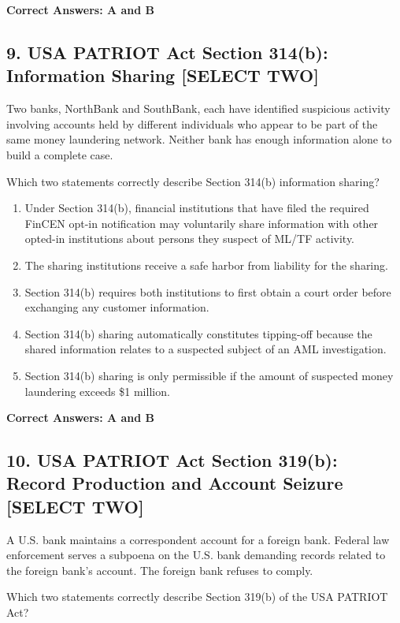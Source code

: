 \documentclass[11pt,a4paper]{article}
\begin{document}
	\textbf{Correct Answers: A and B}
	
	\subsection{9. USA PATRIOT Act Section 314(b): Information Sharing \textnormal{[SELECT TWO]}}
	
	Two banks, NorthBank and SouthBank, each have identified suspicious activity involving accounts held by different individuals who appear to be part of the same money laundering network. Neither bank has enough information alone to build a complete case.
	
	Which two statements correctly describe Section 314(b) information sharing?
	
	\begin{enumerate}[label=\Alph*.]
		\item Under Section 314(b), financial institutions that have filed the required FinCEN opt-in notification may voluntarily share information with other opted-in institutions about persons they suspect of ML/TF activity.
		\item The sharing institutions receive a safe harbor from liability for the sharing.
		\item Section 314(b) requires both institutions to first obtain a court order before exchanging any customer information.
		\item Section 314(b) sharing automatically constitutes tipping-off because the shared information relates to a suspected subject of an AML investigation.
		\item Section 314(b) sharing is only permissible if the amount of suspected money laundering exceeds \$1 million.
	\end{enumerate}
	
	\textbf{Correct Answers: A and B}
	
	\subsection{10. USA PATRIOT Act Section 319(b): Record Production and Account Seizure \textnormal{[SELECT TWO]}}
	
	A U.S. bank maintains a correspondent account for a foreign bank. Federal law enforcement serves a subpoena on the U.S. bank demanding records related to the foreign bank's account. The foreign bank refuses to comply.
	
	Which two statements correctly describe Section 319(b) of the USA PATRIOT Act?
	
\end{document}

